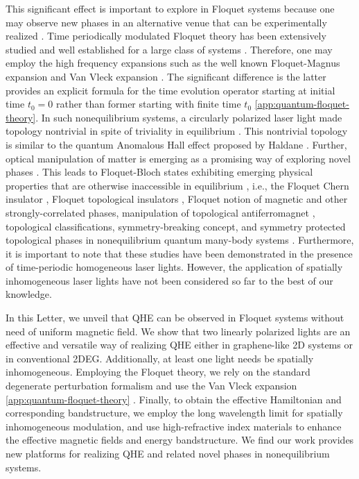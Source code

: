 This significant effect is important to explore in Floquet systems \cite{NHL, AEE} because one may observe new phases in an alternative venue that can be experimentally realized \cite{MCR, YHW, HZJ, JWM,merboldtObservationFloquetStates2024, choiDirectObservationFloquetBloch2024}.
Time periodically modulated Floquet theory has been extensively studied and well established for a large class of systems \cite{JHS,HSA,MGP,MBL,AEE,NGJ}.
Therefore, one may employ the high frequency expansions \cite{MBL,AEE,NGJ,SRI,API,TMS,ESM,TKT,ALA} such as the well known Floquet-Magnus expansion \cite{ESM,TKT,ALA,FCA} and Van Vleck expansion \cite{MBL,AEE}.
The significant difference is the latter provides an explicit formula for the time evolution operator starting at initial time $t_{0}=0$ rather than former starting with finite time $t_{0}$ \ref{app:quantum-floquet-theory}.
In such nonequilibrium systems, a circularly polarized laser light made topology nontrivial in spite of triviality in equilibrium \cite{TKO}.
This nontrivial topology is similar to the quantum Anomalous Hall effect proposed by Haldane \cite{Haldane}.
Further, optical manipulation of matter is emerging as a promising way of exploring novel phases \cite{AKA, JHM}.
This leads to Floquet-Bloch states exhibiting emerging physical properties that are otherwise inaccessible in equilibrium \cite{LST}, i.e., the Floquet Chern insulator \cite{AGG}, Floquet topological insulators \cite{rudnerBandStructureEngineering2020}, Floquet notion of magnetic and other strongly-correlated phases\cite{rudnerBandStructureEngineering2020}, manipulation of topological antiferromagnet \cite{bielinskiFloquetBlochManipulation2025}, topological classifications, symmetry-breaking concept, and symmetry protected topological phases in nonequilibrium quantum many-body systems \cite{EKM, rudnerBandStructureEngineering2020}.
Furthermore, it is important to note that these studies have been demonstrated in the presence of time-periodic homogeneous laser lights.
However, the application of spatially inhomogeneous \cite{SWP1, SWP2, SWP3, SWP4, SWP5} laser lights have not been considered so far to the best of our knowledge.

In this Letter, we unveil that QHE can be observed in Floquet systems without need of uniform magnetic field.
We show that two linearly polarized lights are an effective and versatile way of realizing QHE either in graphene-like 2D systems or in conventional 2DEG.
Additionally, at least one light needs be spatially inhomogeneous.
Employing the Floquet theory, we rely on the standard degenerate perturbation formalism and use the Van Vleck expansion \ref{app:quantum-floquet-theory} \cite{MBL, AEE}.
Finally, to obtain the effective Hamiltonian and corresponding bandstructure, we employ the long wavelength limit for spatially inhomogeneous modulation, and use high-refractive index materials \cite{shimFundamentalLimitsRefractive2021} to enhance the effective magnetic fields and energy bandstructure.
We find our work provides new platforms for realizing QHE and related novel phases in nonequilibrium systems.

